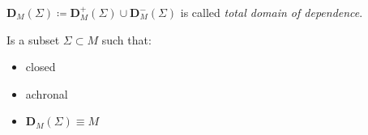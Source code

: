 \documentclass[Main]{subfiles}
\begin{document}
	\begin{notationfix}
		$\mathbf{D}_M(\Sigma)  \coloneq \mathbf{D}_M^+(\Sigma) \cup \mathbf{D}_M^-(\Sigma)$ is called \emph{total domain of dependence}.
	\end{notationfix}

	\begin{definition}
		Is a subset $\Sigma \subset M$ such that:
		\begin{itemize}
			\item closed
			\item achronal
			\item $\mathbf{D}_M(\Sigma) \equiv M$
		\end{itemize}
	\end{definition}
\end{document}
